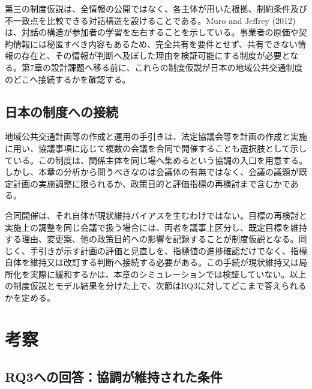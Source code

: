 第三の制度仮説は、全情報の公開ではなく、各主体が用いた根拠、制約条件及び不一致点を比較できる対話構造を設けることである。Muro and Jeffrey (2012)は、対話の構造が参加者の学習を左右することを示している\cite{muro2012time}。事業者の原価や契約情報には秘匿すべき内容もあるため、完全共有を要件とせず、共有できない情報の存在と、その情報が判断へ及ぼした理由を検証可能にする制度が必要となる。第7章の設計課題へ移る前に、これらの制度仮説が日本の地域公共交通制度のどこへ接続するかを確認する。

\subsection{日本の制度への接続}

地域公共交通計画等の作成と運用の手引きは、法定協議会等を計画の作成と実施に用い、協議事項に応じて複数の会議を合同で開催することも選択肢として示している\cite{mlit2023}。この制度は、関係主体を同じ場へ集めるという協調の入口を用意する。しかし、本章の分析から問うべきなのは会議体の有無ではなく、会議の議題が既定計画の実施調整に限られるか、政策目的と評価指標の再検討まで含むかである。

合同開催は、それ自体が現状維持バイアスを生むわけではない。目標の再検討と実施上の調整を同じ会議で扱う場合には、両者を議事上区分し、既定目標を維持する理由、変更案、他の政策目的への影響を記録することが制度仮説となる。同じく、手引きが示す計画の評価と見直しを、指標値の進捗確認だけでなく、指標自体を維持又は改訂する判断へ接続する必要がある。この手続が現状維持又は局所化を実際に緩和するかは、本章のシミュレーションでは検証していない。以上の制度仮説とモデル結果を分けた上で、次節はRQ3に対してどこまで答えられるかを定める。

\section{考察}
\label{sec:ch3_discussion}

\subsection{RQ3への回答：協調が維持された条件}


